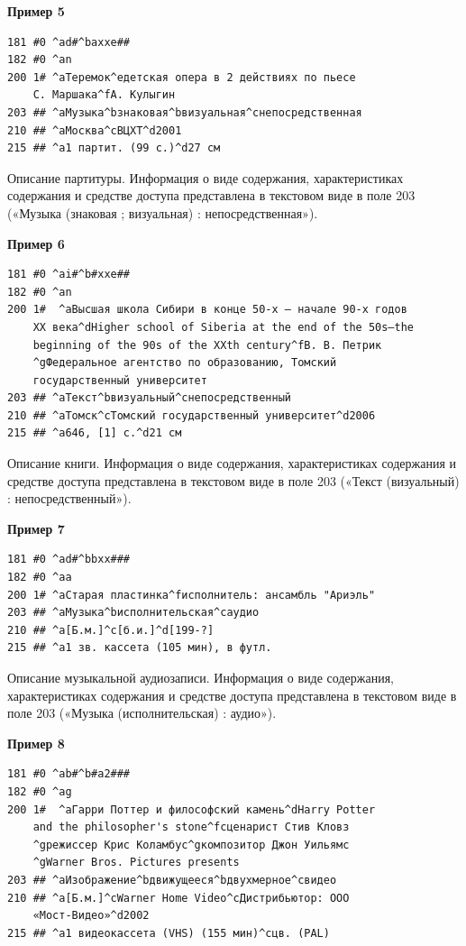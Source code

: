 \textbf{Пример 5}

\begin{verbatim}
181 #0 ^ad#^baxxe##
182 #0 ^an
200 1# ^aТеремок^eдетская опера в 2 действиях по пьесе 
    С. Маршака^fА. Кулыгин
203 ## ^aМузыка^bзнаковая^bвизуальная^cнепосредственная
210 ## ^aМосква^cВЦХТ^d2001
215 ## ^a1 партит. (99 с.)^d27 см
\end{verbatim}

Описание партитуры. Информация о виде содержания, характеристиках содержания и средстве доступа представлена в текстовом виде в поле 203 («Музыка (знаковая ; визуальная) : непосредственная»).

\textbf{Пример 6}

\begin{verbatim}
181 #0 ^ai#^b#xxe##
182 #0 ^an
200 1#	^aВысшая школа Сибири в конце 50-х – начале 90-х годов 
    XX века^dHigher school of Siberia at the end of the 50s–the 
    beginning of the 90s of the XXth century^fВ. В. Петрик
    ^gФедеральное агентство по образованию, Томский 
    государственный университет
203 ## ^aТекст^bвизуальный^cнепосредственный
210 ## ^aТомск^cТомский государственный университет^d2006
215 ## ^a646, [1] с.^d21 см
\end{verbatim}

Описание книги. Информация о виде содержания, характеристиках содержания и средстве доступа представлена в текстовом виде в поле 203 («Текст (визуальный) : непосредственный»).

\textbf{Пример 7}

\begin{verbatim}
181 #0 ^ad#^bbxx###
182 #0 ^aa
200 1# ^aСтарая пластинка^fисполнитель: ансамбль "Ариэль"
203 ## ^aМузыка^bисполнительская^cаудио
210 ## ^a[Б.м.]^c[б.и.]^d[199-?]
215 ## ^a1 зв. кассета (105 мин), в футл.
\end{verbatim}

Описание музыкальной аудиозаписи. Информация о виде содержания, характеристиках содержания и средстве доступа представлена в текстовом виде в поле 203 («Музыка (исполнительская) : аудио»).

\textbf{Пример 8}

\begin{verbatim}
181 #0 ^ab#^b#a2###
182 #0 ^ag
200 1#	^aГарри Поттер и философский камень^dHarry Potter 
    and the philosopher's stone^fсценарист Стив Кловз
    ^gрежиссер Крис Коламбус^gкомпозитор Джон Уильямс
    ^gWarner Bros. Pictures presents
203 ## ^aИзображение^bдвижущееся^bдвухмерное^cвидео
210 ## ^a[Б.м.]^cWarner Home Video^cДистрибьютор: ООО 
    «Мост-Видео»^d2002
215 ## ^a1 видеокассета (VHS) (155 мин)^cцв. (PAL)
\end{verbatim}

